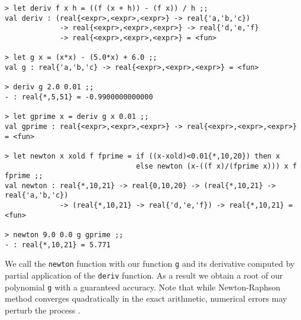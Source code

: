 \begin{verbatim}
> let deriv f x h = ((f (x + h)) - (f x)) / h ;;
val deriv : (real{<expr>,<expr>,<expr>} -> real{'a,'b,'c}) 
             -> real{<expr>,<expr>,<expr>} -> real{'d,'e,'f} 
             -> real{<expr>,<expr>,<expr>} = <fun>

> let g x = (x*x) - (5.0*x) + 6.0 ;;
val g : real{'a,'b,'c} -> real{<expr>,<expr>,<expr>} = <fun>

> deriv g 2.0 0.01 ;;
- : real{*,5,51} = -0.9900000000000

> let gprime x = deriv g x 0.01 ;;
val gprime : real{<expr>,<expr>,<expr>} -> real{<expr>,<expr>,<expr>} = <fun>

> let newton x xold f fprime = if ((x-xold)<0.01{*,10,20}) then x 
                               else newton (x-((f x)/(fprime x))) x f fprime ;;
val newton : real{*,10,21} -> real{0,10,20} -> (real{*,10,21} -> real{'a,'b,'c})
             -> (real{*,10,21} -> real{'d,'e,'f}) -> real{*,10,21} = <fun>

> newton 9.0 0.0 g gprime ;;
- : real{*,10,21} = 5.771
\end{verbatim}
 
 We call the
\texttt{newton} function with our function \texttt{g} and its derivative computed by partial application of the
\texttt{deriv} function. As a result we obtain a root of our polynomial \texttt{g} with a
guaranteed accuracy. Note that while Newton-Raphson method converges quadratically in the exact arithmetic,
numerical errors may perturb the process \cite{DMC15b}. 

